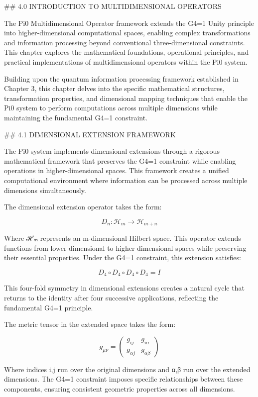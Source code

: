 ## 4.0 INTRODUCTION TO MULTIDIMENSIONAL OPERATORS

The Pi0 Multidimensional Operator framework extends the G4=1 Unity principle into higher-dimensional computational spaces, enabling complex transformations and information processing beyond conventional three-dimensional constraints. This chapter explores the mathematical foundations, operational principles, and practical implementations of multidimensional operators within the Pi0 system.

Building upon the quantum information processing framework established in Chapter 3, this chapter delves into the specific mathematical structures, transformation properties, and dimensional mapping techniques that enable the Pi0 system to perform computations across multiple dimensions while maintaining the fundamental G4=1 constraint.

## 4.1 DIMENSIONAL EXTENSION FRAMEWORK

The Pi0 system implements dimensional extensions through a rigorous mathematical framework that preserves the G4=1 constraint while enabling operations in higher-dimensional spaces. This framework creates a unified computational environment where information can be processed across multiple dimensions simultaneously.

The dimensional extension operator takes the form:

$$D_n: \mathcal{H}_m \rightarrow \mathcal{H}_{m+n}$$

Where ℋₘ represents an m-dimensional Hilbert space. This operator extends functions from lower-dimensional to higher-dimensional spaces while preserving their essential properties. Under the G4=1 constraint, this extension satisfies:

$$D_4 \circ D_4 \circ D_4 \circ D_4 = I$$

This four-fold symmetry in dimensional extensions creates a natural cycle that returns to the identity after four successive applications, reflecting the fundamental G4=1 principle.

The metric tensor in the extended space takes the form:

$$g_{\mu\nu} = \begin{pmatrix} g_{ij} & g_{i\alpha} \\ g_{\alpha j} & g_{\alpha\beta} \end{pmatrix}$$

Where indices i,j run over the original dimensions and α,β run over the extended dimensions. The G4=1 constraint imposes specific relationships between these components, ensuring consistent geometric properties across all dimensions.

